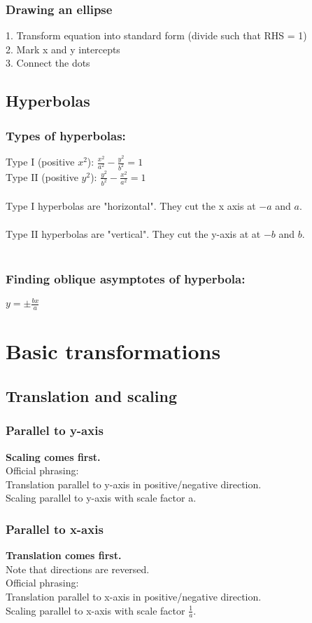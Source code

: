 \subsubsection{Drawing an ellipse}
1. Transform equation into standard form (divide such that RHS = 1) \\
2. Mark x and y intercepts \\
3. Connect the dots

\subsection{Hyperbolas}\label{subsec:hyperbolas}

\subsubsection{Types of hyperbolas:}
Type I (positive $x^2$): $\frac{x^2}{a^2}- \frac{y^2}{b^2}= 1$ \\
Type II (positive $y^2$): $\frac{y^2}{b^2}- \frac{x^2}{a^2}= 1$ \\ \\
Type I hyperbolas are "horizontal".
They cut the x axis at $-a$ and $a$. \\ \\
Type II hyperbolas are "vertical".
They cut the y-axis at at $-b$ and $b$. \\ \\

\subsubsection{Finding oblique asymptotes of hyperbola:}
$y = \pm \frac{bx}{a}$

\section{Basic transformations}\label{sec:basic-transformations}
\subsection{Translation and scaling}\label{subsec:translation}
\subsubsection{Parallel to y-axis}
\textbf{Scaling comes first.} \\
Official phrasing: \\
Translation parallel to y-axis in positive/negative direction. \\
Scaling parallel to y-axis with scale factor a. \\
\subsubsection{Parallel to x-axis}
\textbf{Translation comes first.} \\
Note that directions are reversed. \\
Official phrasing: \\
Translation parallel to x-axis in positive/negative direction. \\
Scaling parallel to x-axis with scale factor $\frac{1}{a}$. \\
